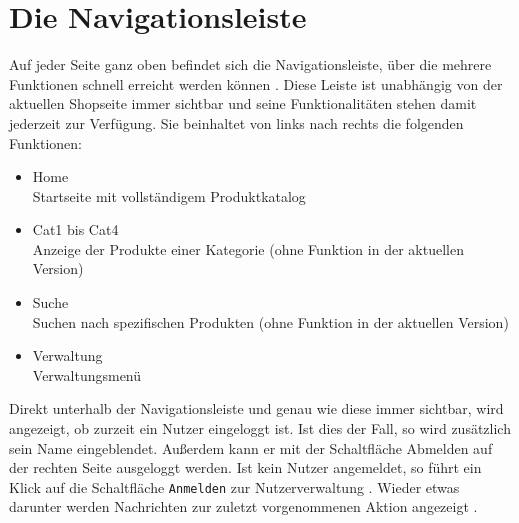 \section{Die Navigationsleiste}
Auf jeder Seite ganz oben befindet sich die Navigationsleiste, über die mehrere Funktionen schnell erreicht werden können . Diese Leiste ist unabhängig von der aktuellen Shopseite immer sichtbar und seine Funktionalitäten stehen damit jederzeit zur Ver\-fü\-gung. Sie beinhaltet von links nach rechts die folgenden Funktionen:
\begin{itemize}
  \item Home \\
        Startseite mit vollständigem Produktkatalog
  \vspace*{-0.5em}
  \item Cat1 bis Cat4 \\
        Anzeige der Produkte einer Kategorie (ohne Funktion in der aktuellen Version)
  \vspace*{-0.5em}
  \item Suche \\
        Suchen nach spezifischen Produkten (ohne Funktion in der aktuellen Version)
  \vspace*{-0.5em}
  \item Verwaltung \\
        Verwaltungsmenü 
\end{itemize}
Direkt unterhalb der Navigationsleiste und genau wie diese immer sichtbar, wird angezeigt, ob zurzeit ein Nutzer eingeloggt ist. Ist dies der Fall, so wird zusätzlich sein Name eingeblendet. Außerdem kann er mit der Schaltfläche Abmelden auf der rechten Seite ausgeloggt werden. Ist kein Nutzer angemeldet, so führt ein Klick auf die Schaltfläche \texttt{Anmelden}  zur Nutzerverwaltung . Wieder etwas darunter werden Nachrichten zur zuletzt vorgenommenen Aktion angezeigt .


